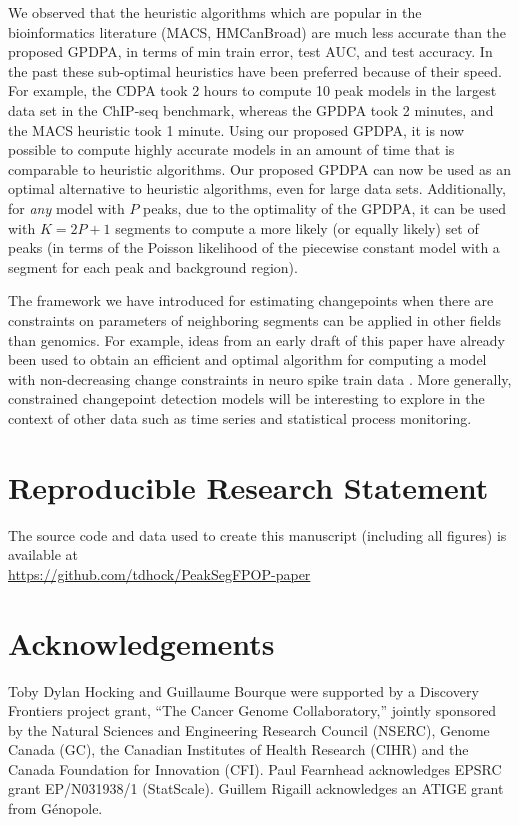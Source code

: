 \documentclass[twoside,11pt]{article}
\begin{document}
We observed that the heuristic algorithms which are popular in the
bioinformatics literature (MACS, HMCanBroad) are much less accurate
than the proposed GPDPA, in terms of min train error, test AUC, and
test accuracy. In the past these sub-optimal heuristics have been
preferred because of their speed. For example, the CDPA took 2 hours
to compute 10 peak models in the largest data set in the ChIP-seq
benchmark, whereas the GPDPA took 2 minutes, and the MACS heuristic
took 1 minute. Using our proposed GPDPA, it is now possible to compute
highly accurate models in an amount of time that is comparable to
heuristic algorithms. Our proposed GPDPA can now be used as an optimal
alternative to heuristic algorithms, even for large data
sets. Additionally, for \emph{any} model with $P$ peaks, due to the optimality of the GPDPA, it can be used 
with $K=2P+1$ segments to compute a more likely (or
equally likely) set of peaks (in terms of the Poisson likelihood of
the piecewise constant model with a segment for each peak and
background region).

The framework we have introduced for estimating changepoints when
there are constraints on parameters of neighboring segments can be
applied in other fields than genomics. For example, ideas from an
early draft of this paper
\citep{Hocking-constrained-changepoint-detection} have already been
used to obtain an efficient and optimal algorithm for computing a model with non-decreasing change constraints in
neuro spike train data \citep{Jewell2018}. More generally, constrained
changepoint detection models will be interesting to explore in the
context of other data such as time series and statistical process
monitoring.
 
\section{Reproducible Research Statement}

The source code and data used to create this manuscript (including all
figures) is available at\\
\url{https://github.com/tdhock/PeakSegFPOP-paper}


\section{Acknowledgements}
  
Toby Dylan Hocking and Guillaume Bourque were supported by a Discovery
Frontiers project grant, ``The Cancer Genome Collaboratory,'' jointly
sponsored by the Natural Sciences and Engineering Research Council
(NSERC), Genome Canada (GC), the Canadian Institutes of Health
Research (CIHR) and the Canada Foundation for Innovation (CFI). Paul
Fearnhead acknowledges EPSRC grant EP/N031938/1 (StatScale).
Guillem Rigaill acknowledges an ATIGE  grant from G\'enopole.
\end{document}
